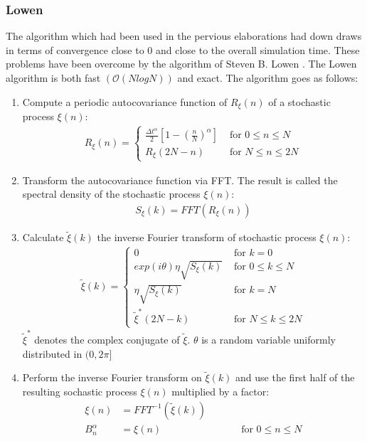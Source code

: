 \documentclass[
  a4paper,BCOR10mm,oneside,
  bibtotoc,idxtotoc,
  headsepline,footsepline,%
  fleqn,openbib
]{scrbook}
\begin{document}
\subsubsection{Lowen}
The algorithm which had been used in the pervious elaborations had down draws in terms of convergence close to 0 and close to the overall simulation time. These problems have been overcome by the algorithm of Steven B. Lowen \cite{Lowen1999}. The Lowen algorithm is both fast  $ (\mathcal{O}(NlogN))$ and exact. The algorithm goes as follows:
\begin{enumerate}
 \item Compute a periodic autocovariance function of $R_{\xi}(n)$ of a stochastic process $\xi(n)$:
 \begin{align}
  R_{\xi}(n)=
  \begin{cases}
   \frac{\Delta t^{\alpha}}{2}\left[1-\left(\frac{n}{N}\right)^{\alpha} \right]  & \text{ for    } 0 \leq n \leq N \\
   R_{\xi}(2N-n)  & \text{ for    } N \leq n \leq 2N 
  \end{cases}
 \end{align}
 \item Transform the autocovariance function via FFT. The result is called the spectral density of the stochastic process $\xi(n)$:
  \begin{align}
   S_{\xi}(k)= FFT(R_{\xi}(n))
  \end{align}
 \item Calculate $\tilde\xi(k)$ the inverse Fourier transform of stochastic process $\xi(n)$:
 \begin{align}
  \tilde\xi(k)=
  \begin{cases}
     0  & \text{ for    } k=0 \\    
     exp(i \theta) \eta \sqrt{S_{\xi}(k)}  & \text{ for    } 0 \leq k \leq N \\
     \eta \sqrt{S_{\xi}(k)}  & \text{ for    } k = N \\
     \tilde\xi^{*}(2N-k) & \text{ for    } N \leq k \leq 2N 
  \end{cases}
 \end{align}
 $\tilde\xi^{*}$ denotes the complex conjugate of $\tilde\xi$. $\theta$ is a random variable uniformly distributed  in $(0,2\pi]$  
 \item Perform the inverse Fourier transform on $\tilde\xi(k)$ and use the first half of the resulting sochastic process $\xi(n)$ multiplied by a factor:
 \begin{align}
  \xi(n)&=FFT^{-1}(\tilde\xi(k)) \\
  B^{\alpha}_n&= \xi(n)  \qquad \qquad \qquad \qquad \text{for    } 0 \leq n \leq N
 \end{align}
\end{enumerate}
\end{document}
